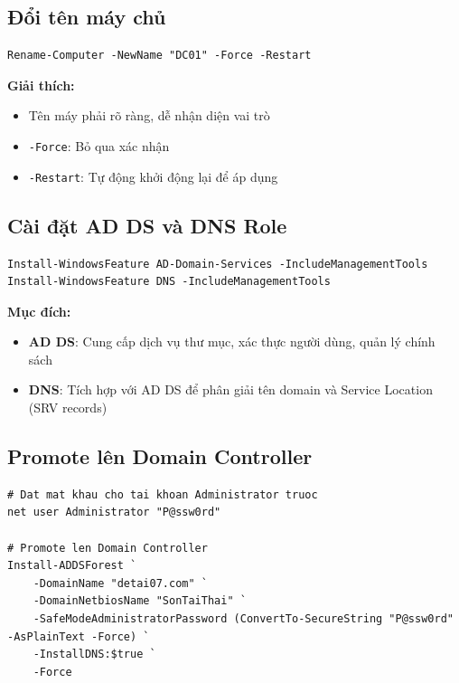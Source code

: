 \subsection{Đổi tên máy chủ}

\begin{lstlisting}
Rename-Computer -NewName "DC01" -Force -Restart
\end{lstlisting}

\textbf{Giải thích:}
\begin{itemize}
    \item Tên máy phải rõ ràng, dễ nhận diện vai trò
    \item \texttt{-Force}: Bỏ qua xác nhận
    \item \texttt{-Restart}: Tự động khởi động lại để áp dụng
\end{itemize}

\subsection{Cài đặt AD DS và DNS Role}

\begin{lstlisting}
Install-WindowsFeature AD-Domain-Services -IncludeManagementTools
Install-WindowsFeature DNS -IncludeManagementTools
\end{lstlisting}

\textbf{Mục đích:}
\begin{itemize}
    \item \textbf{AD DS}: Cung cấp dịch vụ thư mục, xác thực người dùng, quản lý chính sách
    \item \textbf{DNS}: Tích hợp với AD DS để phân giải tên domain và Service Location (SRV records)
\end{itemize}


\subsection{Promote lên Domain Controller}

\begin{lstlisting}
# Dat mat khau cho tai khoan Administrator truoc
net user Administrator "P@ssw0rd"

# Promote len Domain Controller
Install-ADDSForest `
    -DomainName "detai07.com" `
    -DomainNetbiosName "SonTaiThai" `
    -SafeModeAdministratorPassword (ConvertTo-SecureString "P@ssw0rd" -AsPlainText -Force) `
    -InstallDNS:$true `
    -Force
\end{lstlisting}

